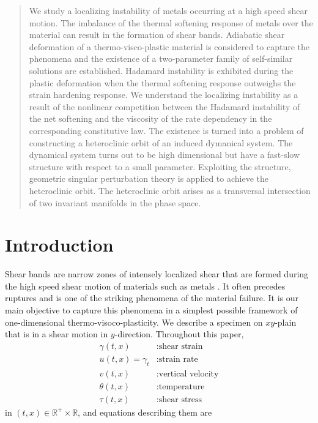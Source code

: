 \documentclass[a4paper,11pt]{article}
\theoremstyle{remark}
\begin{document}
\begin{abstract}
We study a localizing instability of metals occurring at a high speed shear motion. The imbalance of the thermal softening response of metals over the material can result in the formation of shear bands.
Adiabatic shear deformation of a thermo-visco-plastic material is considered to capture the phenomena and the existence of a two-parameter family of self-similar solutions are established. Hadamard instability is exhibited during the plastic deformation when the thermal softening response outweighs the strain hardening response. We understand the localizing instability as a result of the nonlinear competition between the Hadamard instability of the net softening and the viscosity of the rate dependency in the corresponding constitutive law. The existence is turned into a problem of constructing a heteroclinic orbit of an induced dymanical system. %
The dynamical system turns out to be high dimensional but have a fast-slow structure with respect to a small parameter. Exploiting the structure, geometric singular perturbation theory is applied to achieve the heteroclinic orbit. The heteroclinic orbit arises as a transversal intersection of two invariant manifolds in the phase space.
\end{abstract}

\tableofcontents

\section{Introduction}
Shear bands are narrow zones of intensely localized shear that are formed during the high speed shear motion of materials such as metals \cite{zener_effect_1944}. It often precedes ruptures and is one of the striking phenomena of the material failure. It is our main objective to capture this  phenomena in a simplest possible framework of one-dimensional thermo-visoco-plasticity. We describe a specimen on $xy$-plain that is in a shear motion in $y$-direction. Throughout this paper,
\begin{equation} \label{eq:vars}
\begin{aligned}
 \gamma(t,x) &: \text{shear strain}\\
 u(t,x)=\gamma_t &: \text{strain rate}\\
 v(t,x) &: \text{vertical velocity}\\
 \theta(t,x) &: \text{temperature}\\
 \tau(t,x) &: \text{shear stress}
\end{aligned}
\end{equation}
in $(t,x)\in \mathbb{R}^+ \times \mathbb{R}$, and equations describing them are
\end{document}

